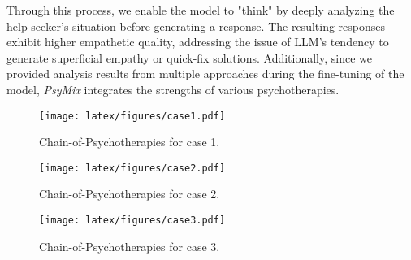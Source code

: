 Through this process, we enable the model to "think" by deeply analyzing the help seeker's situation before generating a response. The resulting responses exhibit higher empathetic quality, addressing the issue of LLM's tendency to generate superficial empathy or quick-fix solutions. Additionally, since we provided analysis results from multiple approaches during the fine-tuning of the model, \textit{PsyMix} integrates the strengths of various psychotherapies.
\begin{figure}[th]
	\centering
	\texttt{[image: latex/figures/case1.pdf]}
	\caption{Chain-of-Psychotherapies for case 1.}
	\label{fig:case1}
\end{figure}

\begin{figure}[th]
	\centering
	\texttt{[image: latex/figures/case2.pdf]}
	\caption{Chain-of-Psychotherapies for case 2.}
	\label{fig:case2}
\end{figure}


\begin{figure}[th]
	\centering
	\texttt{[image: latex/figures/case3.pdf]}
	\caption{Chain-of-Psychotherapies for case 3.}
	\label{fig:case3}
\end{figure}









